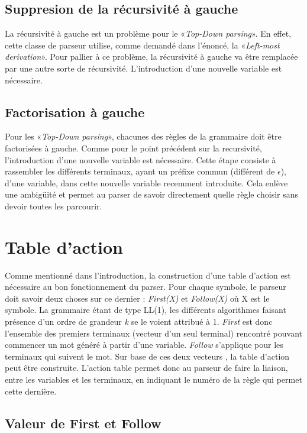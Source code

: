 \documentclass[pdftex,10pt,a4paper]{article}
\begin{document}
\subsection{Suppresion de la récursivité à gauche}
La récursivité à gauche est un problème pour le «\textit{Top-Down parsing}». En effet, cette classe de parseur utilise, comme demandé dans l'énoncé, la «\textit{Left-most derivation}». Pour pallier à ce problème, la récursivité à gauche va être remplacée par une autre sorte de récursivité. L'introduction d'une nouvelle variable est nécessaire.

\subsection{Factorisation à gauche}
Pour les «\textit{Top-Down parsing}», chacunes des règles de la grammaire doit être factorisées à gauche. Comme pour le point précédent sur la recursivité, l'introduction d'une nouvelle variable est nécessaire. Cette étape consiste à rassembler les différents terminaux, ayant un préfixe commun (différent de $\epsilon$), d'une variable, dans cette nouvelle variable recemment introduite. Cela enlève une ambigüité et permet au parser de savoir directement quelle règle choisir sans devoir toutes les parcourir.

\section{Table d'action}

Comme mentionné dans l'introduction, la construction d'une table d'action est nécessaire au bon fonctionnement du parser. Pour chaque symbole, le parseur doit savoir deux choses sur ce dernier : \textit{First(X)} et \textit{Follow(X)} où X est le symbole. La grammaire étant de type LL(1), les différents algorithmes faisant présence d'un ordre de grandeur \textit{k} se le voient attribué à 1. \textit{First} est donc l'ensemble des premiers terminaux (vecteur d'un seul terminal) rencontré pouvant commencer un mot généré à partir d'une variable. \textit{Follow} s'applique pour les terminaux qui suivent le mot. Sur base de ces deux vecteurs , la table d'action peut être construite. L'action table permet donc au parseur de faire la liaison, entre les variables et les terminaux, en indiquant le numéro de la règle qui permet cette dernière.

\subsection{Valeur de First et Follow}
\end{document}
